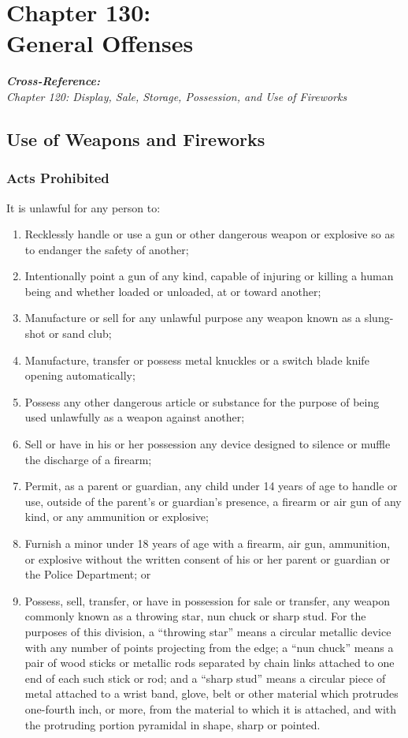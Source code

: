 \chapter*{Chapter 130: \\
	General Offenses}
    \vfill
    \minitoc
    \emph{\textbf{Cross-Reference:}\\
        {\indent}Chapter 120: Display, Sale, Storage, Possession, and Use of Fireworks}\\
    \pagebreak

\section{Use of Weapons and Fireworks}
\subsection{Acts Prohibited}
It is unlawful for any person to:
\begin{enumerate}[{\indent}1)]
    \item Recklessly handle or use a gun or other dangerous weapon or explosive so as to endanger the safety of another;
    \item Intentionally point a gun of any kind, capable of injuring or killing a human being and whether loaded or unloaded, at or toward another;
    \item Manufacture or sell for any unlawful purpose any weapon known as a slung-shot or sand club;
    \item Manufacture, transfer or possess metal knuckles or a switch blade knife opening automatically;
    \item Possess any other dangerous article or substance for the purpose of being used unlawfully as a weapon against another;
    \item Sell or have in his or her possession any device designed to silence or muffle the discharge of a firearm;
    \item Permit, as a parent or guardian, any child under 14 years of age to handle or use, outside of the parent’s or guardian’s presence, a firearm or air gun of any kind, or any ammunition or explosive;
    \item Furnish a minor under 18 years of age with a firearm, air gun, ammunition, or explosive without the written consent of his or her parent or guardian or the Police Department; or
    \item Possess, sell, transfer, or have in possession for sale or transfer, any weapon commonly known as a throwing star, nun chuck or sharp stud.  For the purposes of this division,  a “throwing star” means a circular metallic device with any number of points projecting from the edge; a “nun chuck” means a pair of wood sticks or metallic rods separated by chain links attached to one end of each such stick or rod; and a “sharp stud” means a circular piece of metal attached to a wrist band, glove, belt or other material which protrudes one-fourth inch, or more, from the material to which it is attached, and with the protruding portion pyramidal in shape, sharp or pointed.
\end{enumerate}
